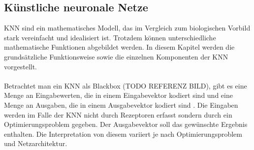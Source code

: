 \subsection{Künstliche neuronale Netze}
\ac{KNN} sind ein mathematisches Modell, das im Vergleich zum biologischen Vorbild stark vereinfacht und idealisiert ist. Trotzdem können unterschiedliche mathematische Funktionen abgebildet werden. In diesem Kapitel werden die grundsätzliche Funktionsweise sowie die einzelnen Komponenten der \ac{KNN} vorgestellt. \\\\
Betrachtet man ein \ac{KNN} als Blackbox (TODO REFERENZ BILD), gibt es eine Menge an Eingabewerten, die in einem Eingabevektor kodiert sind und eine Menge an Ausgaben, die in einem Ausgabevektor kodiert sind \cite{scherer2013neuronale}. Die Eingaben werden im Falle der \ac{KNN} nicht durch Rezeptoren erfasst sondern durch ein Optimierungsproblem gegeben. Der Ausgabevektor soll das gewünschte Ergebnis enthalten. Die Interpretation von diesem variiert je nach Optimierungsproblem und Netzarchitektur. \\

